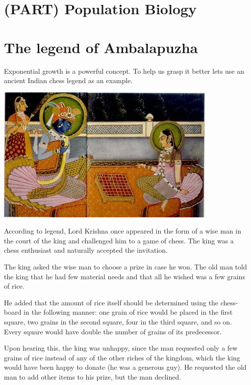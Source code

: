 \documentclass[
  a4paper]{book}
\begin{document}
\hypertarget{part-population-biology}{%
\chapter*{(PART) Population Biology}\label{part-population-biology}}

\hypertarget{the-legend-of-ambalapuzha}{%
\chapter{The legend of Ambalapuzha}\label{the-legend-of-ambalapuzha}}

Exponential growth is a powerful concept. To help us grasp it better
lets use an ancient Indian chess legend as an example.

\begin{center}\includegraphics[width=0.5\linewidth]{images/Radha-Krishna_chess} \end{center}

According to legend, Lord Krishna once appeared in the form of a wise
man in the court of the king and challenged him to a game of chess. The
king was a chess enthusiast and naturally accepted the invitation.

The king asked the wise man to choose a prize in case he won. The old
man told the king that he had few material needs and that all he wished
was a few grains of rice.

He added that the amount of rice itself should be determined using the
chess- board in the following manner: one grain of rice would be placed
in the first square, two grains in the second square, four in the third
square, and so on. Every square would have double the number of grains
of its predecessor.

Upon hearing this, the king was unhappy, since the man requested only a
few grains of rice instead of any of the other riches of the kingdom,
which the king would have been happy to donate (he was a generous guy).
He requested the old man to add other items to his prize, but the man
declined.
\end{document}
